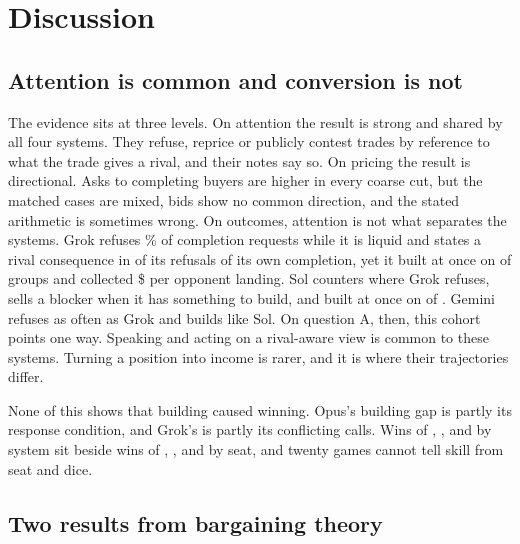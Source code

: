\section{Discussion}
\label{sec:discussion}

\subsection{Attention is common and conversion is not}

The evidence sits at three levels. On attention the result is strong and shared by all four systems. They refuse, reprice or publicly contest trades by reference to what the trade gives a rival, and their notes say so. On pricing the result is directional. Asks to completing buyers are higher in every coarse cut, but the matched cases are mixed, bids show no common direction, and the stated arithmetic is sometimes wrong. On outcomes, attention is not what separates the systems. Grok refuses \% of completion requests while it is liquid and states a rival consequence in  of its  refusals of its own completion, yet it built at once on  of  groups and collected \$ per opponent landing. Sol counters where Grok refuses, sells a blocker when it has something to build, and built at once on  of . Gemini refuses as often as Grok and builds like Sol. On question A, then, this cohort points one way. Speaking and acting on a rival-aware view is common to these systems. Turning a position into income is rarer, and it is where their trajectories differ.

None of this shows that building caused winning. Opus's building gap is partly its response condition, and Grok's is partly its conflicting calls. Wins of , ,  and  by system sit beside wins of , ,  and  by seat, and twenty games cannot tell skill from seat and dice.

\subsection{Two results from bargaining theory}

